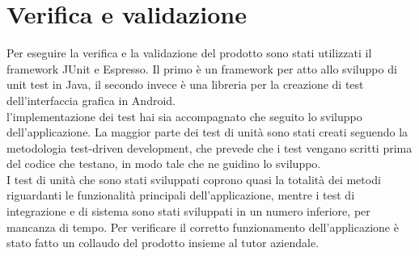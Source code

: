 \documentclass[../Tesi.tex]{subfiles}
\begin{document}
\section{Verifica e validazione}
	Per eseguire la verifica e la validazione del prodotto sono stati utilizzati il framework JUnit e Espresso. Il primo è un framework per atto allo sviluppo di unit test in Java, il secondo invece è una libreria per la creazione di test dell'interfaccia grafica in Android. \\
	l'implementazione dei test hai sia accompagnato che seguito lo sviluppo dell'applicazione. La maggior parte dei test di unità sono stati creati seguendo la metodologia test-driven development, che prevede che i test vengano scritti prima del codice che testano, in modo tale che ne guidino lo sviluppo. \\
	I test di unità che sono stati sviluppati coprono quasi la totalità dei metodi riguardanti le funzionalità principali dell'applicazione, mentre i test di integrazione e di sistema sono stati sviluppati in un numero inferiore, per mancanza di tempo. Per verificare il corretto funzionamento dell'applicazione è stato fatto un collaudo del prodotto insieme al tutor aziendale.
\end{document}
